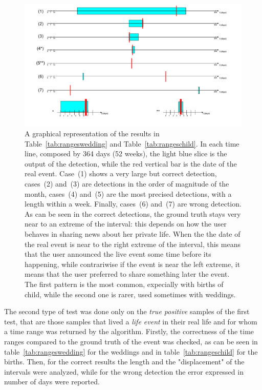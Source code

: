 \begin{figure}
\centering
\includegraphics[width=%
1\textwidth]{img/Timeranges}
\caption{A graphical representation of the results in Table~\ref{tab:rangeswedding} and Table~\ref{tab:rangeschild}. In each time line, composed by 364 days (52 weeks), the light blue slice is the output of the detection, while the red vertical bar is the date of the real event. Case~(1) shows a very large but correct detection, cases~(2) and~(3) are detections in the order of magnitude of the month, cases~(4) and~(5) are the most precised detections, with a length within a week. Finally, cases~(6) and~(7) are wrong detection. As can be seen in the correct detections, the ground truth stays very near to an extreme of the interval: this depends on how the user behaves in sharing news about her private life. When the the date of the real event is near to the right extreme of the interval, this means that the user announced the live event some time before its happening, while contrariwise if the event is near the left extreme, it means that the user preferred to share something later the event. The first pattern is the most common, expecially with births of child, while the second one is rarer, used sometimes with weddings.}
\label{fig:timeranges}
\end{figure}

The second type of test was done only on the \emph{true positive} samples of the first test, that are those samples that lived a \emph{life event} in their real life and for whom a time range was returned by the algorithm. Firstly, the correctness of the time ranges compared to the ground truth of the event was checked, as can be seen in table~\ref{tab:rangeswedding} for the weddings and in table~\ref{tab:rangeschild} for the births. Then, for the correct results the length and the "displacement" of the intervals were analyzed, while for the wrong detection the error expressed in number of days were reported.

